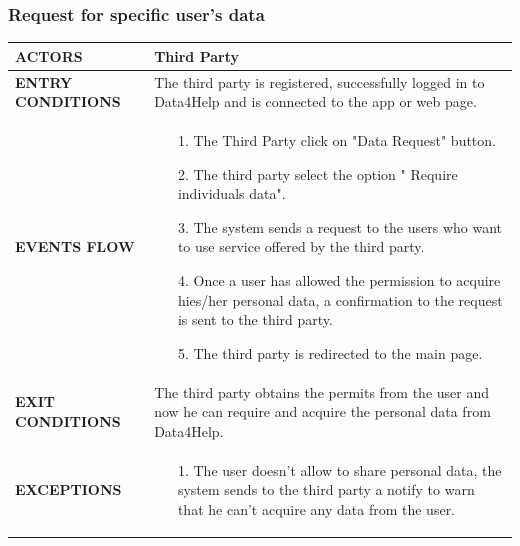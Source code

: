 \documentclass[a4paper]{article}
\begin{document}
\subsubsection{Request for specific user's data}
\begin{center}
    \begin{tabular}{l || p{8cm} ||}
        \bf{ACTORS} & Third Party \\ \hline
        \bf{ENTRY CONDITIONS} & The third party is registered, successfully logged in to Data4Help and is connected to the app or web page.   \\ \hline
        \bf{EVENTS FLOW} & \begin{itemize}[noitemsep, topsep=0cm, leftmargin=*] \vspace{-0.2cm}
            \item[1.] The Third Party click on "Data Request" button.
            \item[2.] The third party select the option " Require individuals data".
            \item[3.] The system sends a request to the users who want to use service offered by the third party.
            \item[4.] Once a user has allowed the permission to acquire hies/her personal data, a confirmation to the request is sent to the third party.
            \item[5.] The third party is redirected to the main page.
        \end{itemize}
        \\ \hline
        \bf{EXIT CONDITIONS} & The third party obtains the permits from the user and now he can require and acquire the personal data from Data4Help. \\ \hline
        \bf{EXCEPTIONS} & \begin{itemize}[noitemsep, topsep=0cm, leftmargin=*] \vspace{-0.2cm}
            \item[1.] The user doesn't allow to share personal data, the system sends to the third party a notify to  warn that he can't acquire any data from the user.
        \end{itemize}
        \\ \hline \hline
    \end{tabular}
\end{center}

\vspace{1cm}

\end{document}
